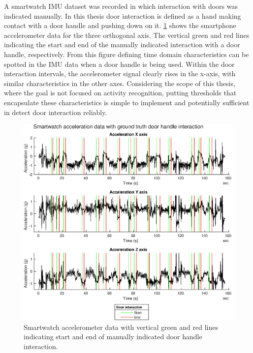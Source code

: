 A smartwatch \ac{IMU} dataset was recorded in which interaction with doors was indicated manually. In this thesis door interaction is defined as a hand making contact with a door handle and pushing down on it.
\cref{fig:smartwatch_acc_with_gt_door_and_door_detect} shows the smartphone accelerometer data for the three orthogonal axis. The vertical green and red lines indicating the start and end of the manually indicated interaction with a door handle, respectively. From this figure defining time domain characteristics can be spotted in the \ac{IMU} data when a door handle is being used. Within the door interaction intervals, the accelerometer signal clearly rises in the x-axis, with similar characteristics in the other axes.  Considering the scope of this thesis, where the goal is not focused on activity recognition, putting thresholds that encapsulate these characteristics is simple to implement and potentially sufficient in detect door interaction reliably.

\begin{figure}[H]
	\centering
	\includegraphics[width=0.8\linewidth]{images/20201123_1010_Acceleration_Z_axis}
	\setlength{\belowcaptionskip}{-20pt}
	\caption{Smartwatch accelerometer data with vertical green and red lines indicating start and end of manually indicated door handle interaction.}
	\label{fig:smartwatch_acc_with_gt_door_and_door_detect}
\end{figure}


